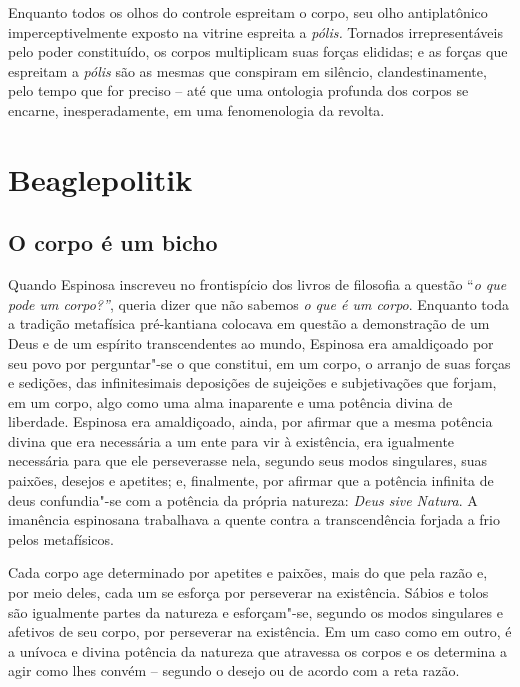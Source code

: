 Enquanto todos os olhos do controle espreitam o corpo, seu olho
antiplatônico imperceptivelmente exposto na vitrine espreita a
\emph{pólis. }Tornados irrepresentáveis pelo poder constituído, os
corpos multiplicam suas forças elididas; e as forças que espreitam a
\emph{pólis} são as mesmas que conspiram em silêncio, clandestinamente,
pelo tempo que for preciso -- até que uma ontologia profunda dos corpos
se encarne, inesperadamente, em uma fenomenologia da revolta.

\chapter{Beaglepolitik}


\section{O corpo é um bicho}

\textbf{}Quando Espinosa inscreveu no frontispício dos livros de
filosofia a questão ``\emph{o que pode um corpo?''}, queria dizer que
não sabemos \emph{o que é um corpo}. Enquanto toda a tradição metafísica
pré-kantiana colocava em questão a demonstração de um Deus e de um
espírito transcendentes ao mundo, Espinosa era amaldiçoado por seu povo
por perguntar"-se o que constitui, em um corpo, o arranjo de suas forças
e sedições, das infinitesimais deposições de sujeições e subjetivações
que forjam, em um corpo, algo como uma alma inaparente e uma potência
divina de liberdade. Espinosa era amaldiçoado, ainda, por afirmar que a
mesma potência divina que era necessária a um ente para vir à
existência, era igualmente necessária para que ele perseverasse nela,
segundo seus modos singulares, suas paixões, desejos e apetites; e,
finalmente, por afirmar que a potência infinita de deus confundia"-se com
a potência da própria natureza: \emph{Deus sive Natura}. A imanência
espinosana trabalhava a quente contra a transcendência forjada a frio
pelos metafísicos.

Cada corpo age determinado por apetites e paixões, mais do que pela
razão e, por meio deles, cada um se esforça por perseverar na
existência. Sábios e tolos são igualmente partes da natureza e
esforçam"-se, segundo os modos singulares e afetivos de seu corpo, por
perseverar na existência. Em um caso como em outro, é a unívoca e divina
potência da natureza que atravessa os corpos e os determina a agir como
lhes convém -- segundo o desejo ou de acordo com a reta razão.

